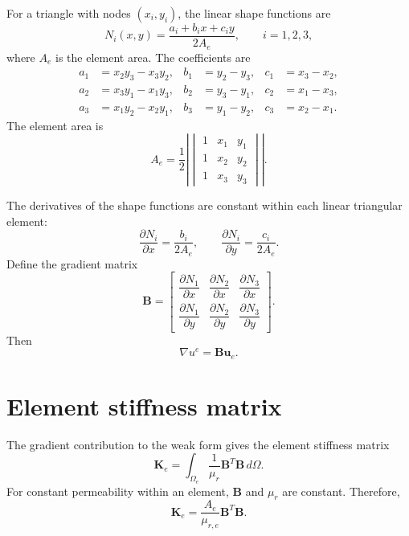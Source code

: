 \documentclass{article}
\begin{document}
For a triangle with nodes $(x_i,y_i)$, the linear shape functions are
\begin{equation}
    N_i(x,y)=\frac{a_i+b_ix+c_iy}{2A_e},
    \qquad i=1,2,3,
    \label{eq:shape_functions}
\end{equation}
where $A_e$ is the element area. The coefficients are
\begin{align}
    a_1 &= x_2y_3-x_3y_2,&
    b_1 &= y_2-y_3,&
    c_1 &= x_3-x_2,\\
    a_2 &= x_3y_1-x_1y_3,&
    b_2 &= y_3-y_1,&
    c_2 &= x_1-x_3,\\
    a_3 &= x_1y_2-x_2y_1,&
    b_3 &= y_1-y_2,&
    c_3 &= x_2-x_1.
\end{align}
The element area is
\begin{equation}
    A_e=\frac{1}{2}
    \left|
    \begin{vmatrix}
        1&x_1&y_1\\
        1&x_2&y_2\\
        1&x_3&y_3
    \end{vmatrix}
    \right|.
\end{equation}

The derivatives of the shape functions are constant within each
linear triangular element:
\begin{equation}
    \frac{\partial N_i}{\partial x}
    =\frac{b_i}{2A_e},
    \qquad
    \frac{\partial N_i}{\partial y}
    =\frac{c_i}{2A_e}.
\end{equation}
Define the gradient matrix
\begin{equation}
    \mathbf{B}=
    \begin{bmatrix}
        \dfrac{\partial N_1}{\partial x}&
        \dfrac{\partial N_2}{\partial x}&
        \dfrac{\partial N_3}{\partial x}\\[6pt]
        \dfrac{\partial N_1}{\partial y}&
        \dfrac{\partial N_2}{\partial y}&
        \dfrac{\partial N_3}{\partial y}
    \end{bmatrix}.
\end{equation}
Then
\begin{equation}
    \nabla u^e=\mathbf{B}\mathbf{u}_e.
\end{equation}

\section{Element stiffness matrix}

The gradient contribution to the weak form gives the element stiffness
matrix
\begin{equation}
    \mathbf{K}_e=
    \int_{\Omega_e}
    \frac{1}{\mu_r}\mathbf{B}^T\mathbf{B}\,d\Omega.
    \label{eq:element_stiffness_integral}
\end{equation}
For constant permeability within an element, $\mathbf{B}$ and $\mu_r$
are constant. Therefore,
\begin{equation}
    \boxed{
    \mathbf{K}_e=
    \frac{A_e}{\mu_{r,e}}\mathbf{B}^T\mathbf{B}.
    }
    \label{eq:element_stiffness}
\end{equation}
\end{document}

